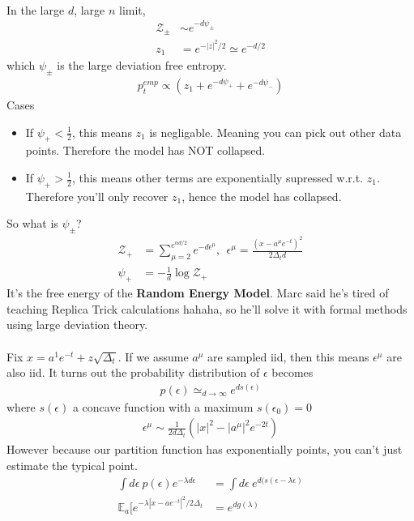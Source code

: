\\
In the large $d$, large $n$ limit, 
\begin{align}
	\mathcal Z_{\pm} & \sim e^{-d \psi_{\pm}}\\
	z_1 & = e^{- |z|^2/2} \simeq e^{-d/2}
\end{align}
which $\psi_{\pm}$ is the large deviation free entropy.
\begin{align}
	p_t^{emp} \propto (z_1 + e^{-d \psi_+} + e^{-d \psi_-})
\end{align}
Cases
\begin{itemize}
	\item If $\psi_+ < \frac{1}{2}$, this means $z_1$ is negligable. Meaning you can pick out other data points. Therefore the model has NOT collapsed.
	\item If $\psi_+ > \frac{1}{2}$, this means other terms are exponentially supressed w.r.t. $z_1$. Therefore you'll only recover $z_1$, hence the model has collapsed.
\end{itemize}
So what is $\psi_{\pm}$?
\begin{align}
	\mathcal Z_+ & = \sum_{\mu=2}^{e^{\alpha d /2}} e^{-d \epsilon^\mu}, ~~ \epsilon^\mu = \frac{(x - a^\mu e^{-t})^2}{2 \Delta_t d}\\
	\psi_+ & = - \frac{1}{d} \log \mathcal Z_+
\end{align}
It's the free energy of the \textbf{Random Energy Model}. Marc said he's tired of teaching Replica Trick calculations hahaha, so he'll solve it with formal methods using large deviation theory.\\
\\
Fix $x = a^1 e^{-t} + z \sqrt{\Delta_t}$. If we assume $a^\mu$ are sampled iid, then this means $\epsilon^\mu$ are also iid. It turns out the probability distribution of $\epsilon$ becomes
\begin{align}
	p(\epsilon) \simeq_{d \to \infty} e^{d s(\epsilon)}
\end{align}
where $s(\epsilon)$ a concave function with a maximum $s(\epsilon_0) = 0$
\begin{align}
	\epsilon^\mu \sim \frac{1}{2d \Delta_t}(|x|^2 - |a^\mu|^2 e^{-2t})
\end{align}
However because our partition function has exponentially points, you can't just estimate the typical point.
\begin{align}
	\int d\epsilon ~p(\epsilon) e^{- \lambda d \epsilon} & = \int d\epsilon ~e^{d(s(\epsilon - \lambda \epsilon)}\\
	\mathbb E_a[e^{- \lambda |x- ae^{-t}|^2/2\Delta_t}& = e^{d g(\lambda)}
\end{align}
